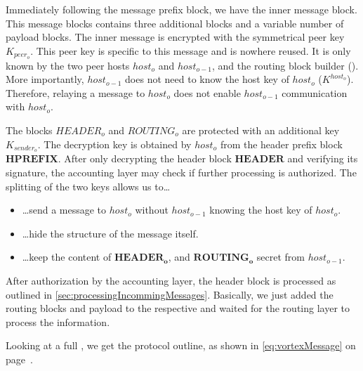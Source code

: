 Immediately following the message prefix block, we have the inner message block. This message blocks contains three additional blocks and a variable number of payload blocks. The inner message is encrypted with the symmetrical peer key $K_{peer_o}$. This peer key is specific to this message and is nowhere reused. It is only known by the two peer hosts $host_o$ and $host_{o-1}$, and the routing block builder (). More importantly, $host_{o-1}$ does not need to know the host key of $host_o$ ($K^{host_o}$). Therefore, relaying a message to $host_o$ does not enable $host_{o-1}$ communication with $host_o$. 

The blocks $HEADER_o$ and $ROUTING_o$ are protected with an additional key $K_{sender_o}$. The decryption key is obtained by $host_o$ from the header prefix block $\mathbf{HPREFIX}$. After only decrypting the header block $\mathbf{HEADER}$ and verifying its signature, the accounting layer may check if further processing is authorized. The splitting of the two keys allows us to\ldots
\begin{itemize}
	\item \ldots send a message to $host_o$ without $host_{o-1}$ knowing the host key of $host_o$.
	\item \ldots hide the structure of the message itself.
	\item \ldots keep the content of $\mathbf{HEADER_o}$, and $\mathbf{ROUTING_o}$ secret from $host_{o-1}$.
\end{itemize}

After authorization by the accounting layer, the header block is processed as outlined in \cref{sec:processingIncommingMessages}. Basically, we just added the routing blocks and payload to the respective  and waited for the routing layer to process the information.

Looking at a full \VortexMessage, we get the protocol outline, as shown in \eqref{eq:vortexMessage} on page~\pageref{eq:vortexMessage}.

